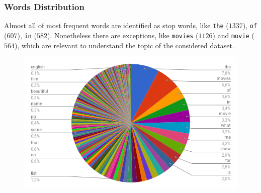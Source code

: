 \documentclass[11pt,a4paper]{article}
\begin{document}
\subsubsection{Words Distribution}

Almost all of most frequent words are identified as stop words, like {\tt the} ($1337$), {\tt of} ($607$), {\tt in} ($582$). Nonetheless there are exceptions, like {\tt movies} ($1126$) and {\tt movie} ($564$), which are relevant to understand the topic of the considered dataset.

\begin{figure}[H]
	\includegraphics[scale=.35]{img/Word_chart.png}
	\label{fig:f1res}
\end{figure}

%
%
%



%
\end{document}
